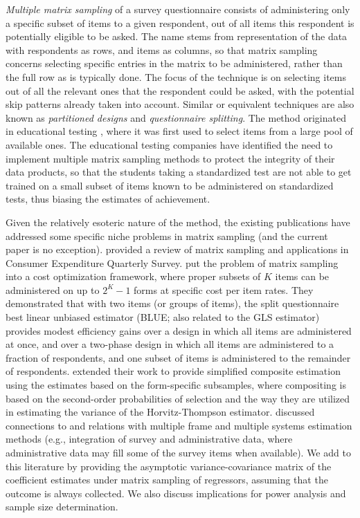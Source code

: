 \documentclass[11pt]{asaproc}
\begin{document}
\textit{Multiple matrix sampling} of a survey questionnaire consists
of administering only a specific subset of items to a given respondent, out of all items
this respondent is potentially eligible to be asked. The name stems from representation of the data
with respondents as rows, and items as columns, so that matrix sampling concerns selecting
specific entries in the matrix to be administered, rather than the full row as is typically done.
The focus of the technique is on selecting items out of all the relevant ones that the respondent
could be asked, with the potential skip  patterns already taken into account.
Similar or equivalent techniques are also known as \textit{partitioned designs}
and \textit{questionnaire splitting}. The method originated in educational testing
\citep{shoemaker:1972}, where it was first used to select items from a large pool
of available ones. The educational testing companies have identified the need to implement
multiple matrix sampling methods to protect the integrity of their data products, so that
the students taking a standardized test are not able to get
trained on a small subset of items known to be administered on standardized tests, thus
biasing the estimates of achievement.

Given the relatively esoteric nature of the method, the existing publications
have addressed some specific niche problems in matrix sampling (and the current paper
is no exception).
\citet{gonzalez:eltinge:2007} provided a review of matrix sampling
and applications in Consumer Expenditure Quarterly Survey.
\citet{chipperfield:steel:2009} put the problem of matrix sampling into a cost
optimization framework, where proper subsets of $K$ items can be administered on
up to $2^K-1$ forms at specific cost per item rates. They demonstrated that
with two items (or groups of items),
the split questionnaire best linear unbiased estimator (BLUE; also related to the GLS
estimator) provides modest efficiency gains over a design in which all items
are administered at once, and over a two-phase design in which all items are administered
to a fraction of respondents, and one subset of items is administered to the remainder of respondents.
\citet{merkouris:2010} extended their work to provide simplified composite estimation
using the estimates based on the form-specific subsamples, where compositing is based
on the second-order probabilities of selection and the way they are utilized
in estimating the variance of the Horvitz-Thompson estimator.
\citet{eltinge:2013} discussed connections to and relations with multiple frame
and multiple systems estimation methods (e.g., integration of survey and administrative
data, where administrative data may fill some of the survey items when available).
We add to this literature by providing the asymptotic variance-covariance matrix
of the coefficient estimates under matrix sampling of regressors, assuming
that the outcome is always collected. We also discuss implications for power analysis
and sample size determination.
\end{document}

